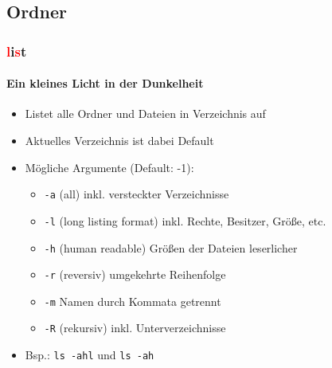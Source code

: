 \documentclass[12pt,utf8, handout]{beamer}
\begin{document}
\subsection{Ordner}
\begin{frame}
\frametitle{\textcolor{red}{l}i\textcolor{red}{s}t}
\framesubtitle{\textcolor{ownDarkOr}{Ein kleines Licht in der Dunkelheit}}
\begin{itemize}
	\item Listet alle Ordner und Dateien in Verzeichnis auf
	\item Aktuelles Verzeichnis ist dabei Default
	\item Mögliche Argumente (Default: -1):
	\begin{itemize}[<+->]
		\item \texttt{-a}  (all) inkl. versteckter Verzeichnisse
		\item \texttt{-l}  (long listing format) inkl. Rechte, Besitzer, Größe, etc.
		\item \texttt{-h}  (human readable) Größen der Dateien leserlicher
		\item \texttt{-r}  (reversiv) umgekehrte Reihenfolge
		\item \texttt{-m}  Namen durch Kommata getrennt
		\item \texttt{-R}  (rekursiv) inkl. Unterverzeichnisse
	\end{itemize}
	\item Bsp.: \texttt{ls -ahl} und \texttt{ls -ah}
\end{itemize}
\end{frame}
\end{document}
